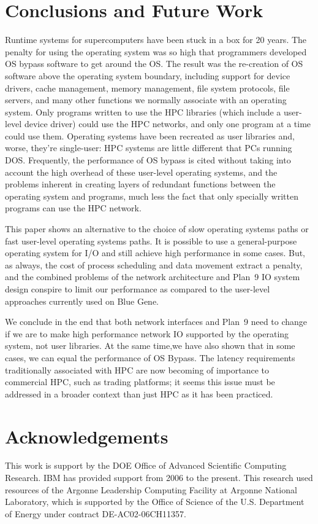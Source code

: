 \documentclass[a4,10pt,preprint]{sigplanconf}
\begin{document}
\section{Conclusions and Future Work}
Runtime systems for supercomputers have been stuck in a box for 20 years. The penalty for using the operating system was so high that programmers developed OS bypass software to get around the OS. The result was the re-creation of OS software above the operating system boundary, including support for device drivers, cache management, memory management, file system protocols, file servers, and many other functions we normally associate with an operating system. Only programs written to use the HPC libraries (which include a user-level device driver) could use the HPC networks, and only one program at a time could use them. Operating systems have been recreated as user libraries and, worse, they're single-user: HPC systems are little different that PCs running  DOS. Frequently, the performance of OS bypass is cited without taking into account the high overhead of these user-level operating systems, and the problems inherent in creating layers of redundant functions between the operating system and programs, much less the fact that only specially written programs can use the HPC network. 

This paper shows an alternative to the choice of slow operating systems paths or fast user-level operating systems paths. It is possible to use a general-purpose operating system for I/O and still achieve high performance in some cases. But, as always, the cost of process scheduling and data movement extract a penalty, and the combined problems of the network architecture and Plan~9 IO system design conspire to limit our performance as compared to the user-level approaches currently used on Blue Gene. 

We conclude in the end that both network interfaces and Plan~9 need to change if we are to make high performance network IO supported by the operating system, not user libraries. At the same time,we have also shown that in some cases, we can equal the performance of OS Bypass. The latency requirements traditionally associated with HPC are now becoming of importance to commercial HPC, such as trading platforms; it seems this issue must be addressed in a broader context than just HPC as it has been practiced. 

\section{Acknowledgements}
This work is support by the DOE Office of Advanced Scientific Computing Research. IBM has provided support from 2006 to the present. This research used resources of the Argonne Leadership Computing Facility
 at Argonne National Laboratory, which is supported by the Office of Science
 of the U.S.
 Department of Energy under contract DE-AC02-06CH11357.

 


\end{document}
